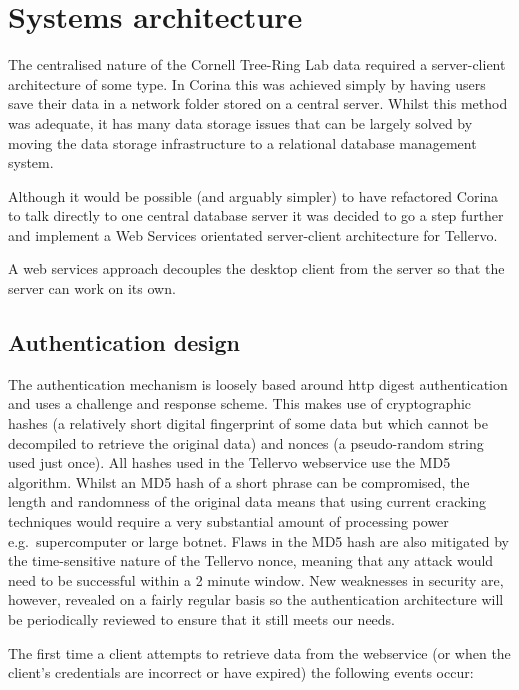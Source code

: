
\chapter{Systems architecture}
The centralised nature of the Cornell Tree-Ring Lab data required a server-client architecture of some type. In Corina this was achieved simply by having users save their data in a network folder stored on a central server. Whilst this method was adequate, it has many data storage issues that can be largely solved by moving the data storage infrastructure to a relational database management system.  

Although it would be possible (and arguably simpler) to have refactored Corina to talk directly to one central database server it was decided to go a step further and implement a Web Services orientated server-client architecture for Tellervo.  

A web services approach decouples the desktop client from the server so that the server can work on its own.

\section{Authentication design}
\label{txt:authentication}
The authentication mechanism is loosely based around http digest authentication and uses a challenge and response scheme. This makes use of cryptographic hashes (a relatively short digital fingerprint of some data but which cannot be decompiled to retrieve the original data) and nonces (a pseudo-random string used just once). All hashes used in the Tellervo webservice use the MD5 algorithm. Whilst an MD5 hash of a short phrase can be compromised, the length and randomness of the original data means that using current cracking techniques would require a very substantial amount of processing power e.g.\ supercomputer or large botnet.  Flaws in the MD5 hash are also mitigated by the time-sensitive nature of the Tellervo nonce, meaning that any attack would need to be successful within a 2 minute window.  New weaknesses in security are, however, revealed on a fairly regular basis so the authentication architecture will be periodically reviewed to ensure that it still meets our needs. 

The first time a client attempts to retrieve data from the webservice (or when the client's credentials are incorrect or have expired) the following events occur:


